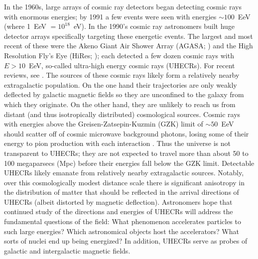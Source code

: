 In the 1960s, large arrays of cosmic ray detectors began detecting cosmic rays
with enormous energies; by 1991 a few events were seen with energies $\sim
100$~EeV (where 1~EeV $=10^{18}$~eV). In the 1990's cosmic ray astronomers
built huge detector arrays specifically targeting these energetic events.  The
largest and most recent of these were the Akeno Giant Air Shower Array (AGASA;
\cite{1992APh.....1...27C}) and the High Resolution Fly's Eye (HiRes;
\cite{2002NIMPA.482..457B}); each detected a few dozen cosmic rays with
$E>10$~EeV, so-called ultra-high energy cosmic rays (UHECRs). For recent
reviews, see \cite{KO11-UHECRs,LS11-UHECRs}.  The sources of
these cosmic rays likely form a relatively nearby extragalactic population. On
the one hand their trajectories are only weakly deflected by galactic magnetic
fields so they are unconfined to the galaxy from which they originate.  On the
other hand, they are unlikely to reach us from distant (and thus isotropically
distributed) cosmological sources.  Cosmic rays with energies above the
Greisen-Zatsepin-Kuzmin (GZK) limit of $\sim 50$~EeV  should scatter off of
cosmic microwave background photons, losing some of their energy to pion
production with each interaction
\cite{G66-GZK,ZK66-GZK}. Thus the universe is not
transparent to UHECRs; they are not expected to travel more than about 50 to
100 megaparsecs (Mpc) before their energies fall below the GZK limit. 
Detectable UHECRs likely emanate from relatively nearby extragalactic sources.
 Notably, over this cosmologically modest distance scale there is significant
anisotropy in the distribution of matter that should be reflected in the
arrival directions of UHECRs (albeit distorted by magnetic deflection). 
Astronomers hope that continued study of the directions and energies of UHECRs
will address the fundamental questions of the field: What phenomenon
accelerates particles to such large energies?  Which astronomical objects host
the accelerators?  What sorts of nuclei end up being energized?  In
addition, UHECRs serve as probes of galactic and intergalactic magnetic
fields.

